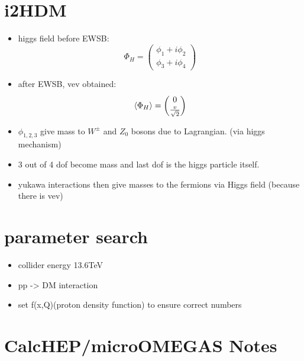 \documentclass[11pt,a4paper]{article}
\begin{document}
\section{i2HDM}
\begin{itemize}
    \item higgs field before EWSB:
        \begin{equation}
            \Phi_H =
                \begin{pmatrix}
                    {\phi_1 + i\phi_2} \\
                    {\phi_3 + i\phi_4}
                \end{pmatrix}
        \end{equation}
    \item after EWSB, vev obtained:
        \begin{equation}
            \braket{\Phi_H} =
                \begin{pmatrix}
                    {0} \\
                    {\frac{v}{\sqrt{2}}}
                \end{pmatrix}
        \end{equation}
    \item $\phi_{1, 2, 3}$ give mass to $W^\pm$ and $Z_0$ bosons due to Lagrangian. (via higgs mechanism)
    \item 3 out of 4 dof become mass and last dof is the higgs particle itself.
    \item yukawa interactions then give masses to the fermions via Higgs field (because there is vev)
\end{itemize}

\section{parameter search}
\begin{itemize}
    \item collider energy 13.6TeV
    \item pp -> DM interaction
    \item set f(x,Q)(proton density function) to ensure correct numbers
    
\end{itemize}
\section{CalcHEP/microOMEGAS Notes}
\end{document}
